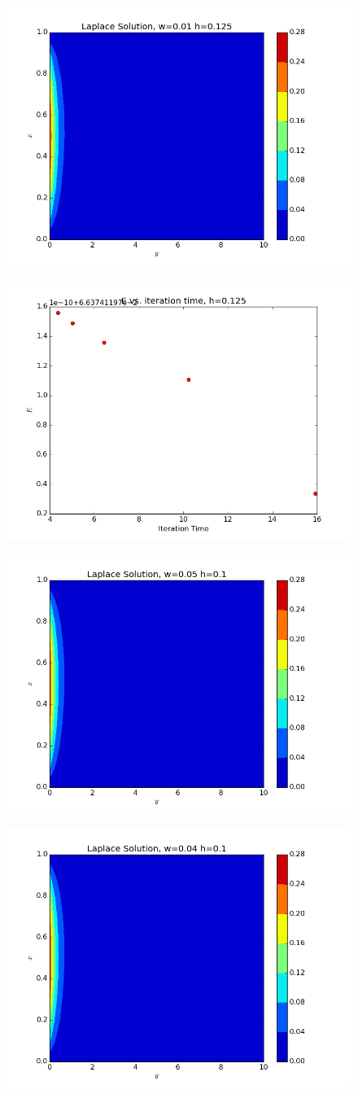 \documentclass[10pt,letter]{article}
\begin{document}
\begin{figure}[H]
  \centering
    \includegraphics[width=.6\textwidth]{homework7_problem1_plot17}
\end{figure}
\begin{figure}[H]
  \centering
    \includegraphics[width=.6\textwidth]{homework7_problem1_plot18}
\end{figure}
\begin{figure}[H]
  \centering
    \includegraphics[width=.6\textwidth]{homework7_problem1_plot19}
\end{figure}
\begin{figure}[H]
  \centering
    \includegraphics[width=.6\textwidth]{homework7_problem1_plot20}
\end{figure}
\end{document}
